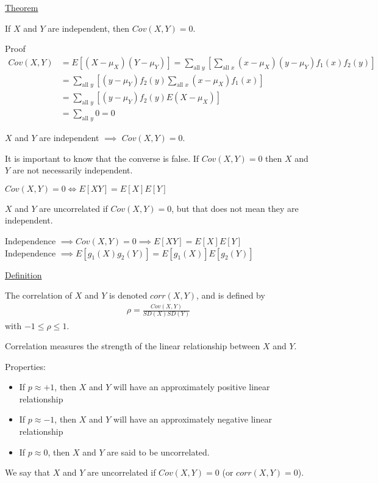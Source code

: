 \documentclass{article}
\begin{document}
\underline{Theorem}

If $X$ and $Y$ are independent, then $Cov(X,Y) = 0$. 

Proof
\begin{align*}
    Cov(X,Y) &= E[(X - \mu_X)(Y - \mu_Y)] = \sum_{\text{all }y}\left [ \sum_{\text{all }x}(x - \mu_X)(y-\mu_Y)f_1(x)f_2(y) \right ] \\
    &= \sum_{\text{all }y}\left [ (y - \mu_Y)f_2(y) \sum_{\text{all }x}(x-\mu_X)f_1(x) \right ]\\
    &= \sum_{\text{all }y}\left [ (y- \mu_Y) f_2(y) E(X - \mu_X) \right ] \\
    &= \sum_{\text{all }y}0 = 0
\end{align*}

$X$ and $Y$ are independent $\implies$ $Cov(X,Y) = 0$. 

It is important to know that the converse is false. If $Cov(X,Y) = 0$ then $X$ and $Y$ are not necessarily independent. 

$Cov(X,Y) = 0 \iff E[XY] = E[X]E[Y]$

$X$ and $Y$ are uncorrelated if $Cov(X,Y) = 0$, but that does not mean they are independent. 


Independence $\implies Cov(X,Y) = 0 \implies E[XY] = E[X]E[Y]$\\
Independence $\implies E[g_1(X)g_2(Y)] = E[g_1(X)]E[g_2(Y)]$

\underline{Definition}

The correlation of $X$ and $Y$ is denoted $corr(X,Y)$, and is defined by
\begin{align*}
    \rho = \frac{Cov(X,Y)}{SD(X)SD(Y)}
\end{align*}
with $-1 \le \rho \le 1$.

Correlation measures the strength of the linear relationship between $X$ and $Y$. 

Properties:
\begin{itemize}
    \item If $p \approx +1 $, then $X$ and $Y$ will have an approximately positive linear relationship
    \item If $p \approx -1$, then $X$ and $Y$ will have an approximately negative linear relationship
    \item If $p \approx 0 $, then $X$ and $Y$ are said to be uncorrelated. 
\end{itemize}

We say that $X$ and $Y$ are uncorrelated if $Cov(X,Y) = 0$ (or $corr(X,Y) = 0$).
\end{document}

